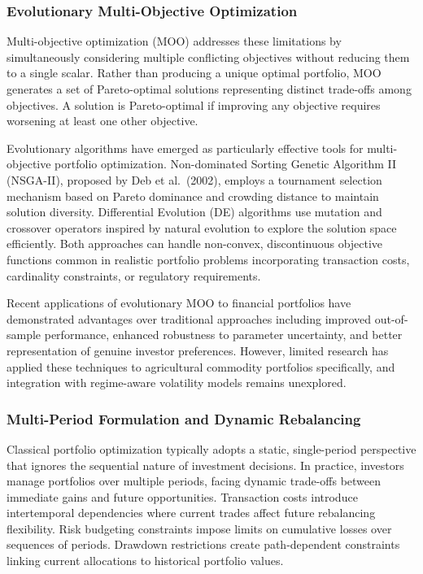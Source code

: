 \documentclass[
  10pt,
  a4paper,
]{article}
\begin{document}
\subsubsection{Evolutionary Multi-Objective
Optimization}\label{evolutionary-multi-objective-optimization}

Multi-objective optimization (MOO) addresses these limitations by
simultaneously considering multiple conflicting objectives without
reducing them to a single scalar. Rather than producing a unique optimal
portfolio, MOO generates a set of Pareto-optimal solutions representing
distinct trade-offs among objectives. A solution is Pareto-optimal if
improving any objective requires worsening at least one other objective.

Evolutionary algorithms have emerged as particularly effective tools for
multi-objective portfolio optimization. Non-dominated Sorting Genetic
Algorithm II (NSGA-II), proposed by Deb et al.~(2002), employs a
tournament selection mechanism based on Pareto dominance and crowding
distance to maintain solution diversity. Differential Evolution (DE)
algorithms use mutation and crossover operators inspired by natural
evolution to explore the solution space efficiently. Both approaches can
handle non-convex, discontinuous objective functions common in realistic
portfolio problems incorporating transaction costs, cardinality
constraints, or regulatory requirements.

Recent applications of evolutionary MOO to financial portfolios have
demonstrated advantages over traditional approaches including improved
out-of-sample performance, enhanced robustness to parameter uncertainty,
and better representation of genuine investor preferences. However,
limited research has applied these techniques to agricultural commodity
portfolios specifically, and integration with regime-aware volatility
models remains unexplored.

\subsubsection{Multi-Period Formulation and Dynamic
Rebalancing}\label{multi-period-formulation-and-dynamic-rebalancing}

Classical portfolio optimization typically adopts a static,
single-period perspective that ignores the sequential nature of
investment decisions. In practice, investors manage portfolios over
multiple periods, facing dynamic trade-offs between immediate gains and
future opportunities. Transaction costs introduce intertemporal
dependencies where current trades affect future rebalancing flexibility.
Risk budgeting constraints impose limits on cumulative losses over
sequences of periods. Drawdown restrictions create path-dependent
constraints linking current allocations to historical portfolio values.
\end{document}
